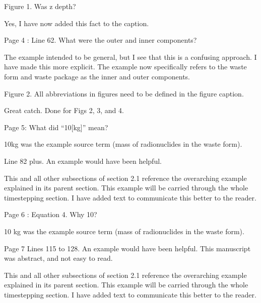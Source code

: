 \documentclass[answers,12pt]{exam}
\begin{document}
\begin{questions}
\question Figure 1. Was z depth?
\begin{solution}
Yes, I have now added this fact to the caption.
\end{solution}

\question Page 4 : Line 62. What were the outer and inner components?

\begin{solution}
        The example intended to be general, but I see that this is a confusing 
approach. I have made this more explicit. The example now specifically refers 
to the waste form and waste package as the inner and outer components.  
\end{solution}
 

\question Figure 2. All abbreviations in figures need to be defined in the 
        figure caption.
\begin{solution}
Great catch. Done for Figs 2, 3, and 4.
\end{solution}
 

\question Page 5: What did ``10[kg]'' mean?
\begin{solution}
        10kg was the example source term (mass of radionuclides in the waste 
        form).
\end{solution}
 

\question Line 82 plus. An example would have been helpful.
\begin{solution}
This and all other subsections of section 2.1 reference the overarching example 
        explained in its parent section. This example will be carried through 
        the whole timestepping section. I have added text to communicate this 
        better to the reader. 
\end{solution}

 

\question Page 6 : Equation 4. Why 10?
\begin{solution}
        10 kg was the example source term (mass of radionuclides in the waste 
        form).
\end{solution}

\question Page 7 Lines 115 to 128. An example would have been helpful. This 
manuscript was abstract, and not easy to read.

\begin{solution}
This and all other subsections of section 2.1 reference the overarching example 
        explained in its parent section. This example will be carried through 
        the whole timestepping section. I have added text to communicate this 
        better to the reader. 
\end{solution}
 


\end{questions}
\end{document}
